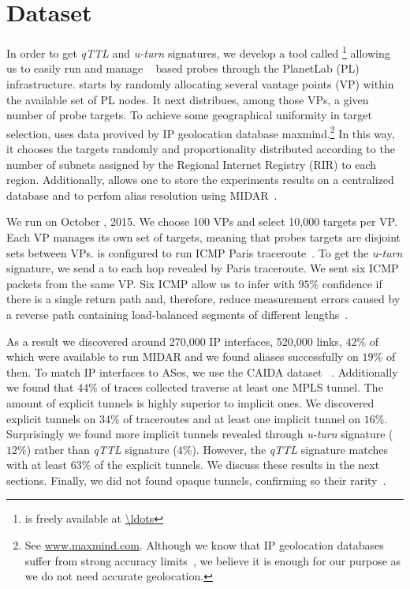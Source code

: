 \section{Dataset}\label{dataset}
In order to get \textit{qTTL} and \textit{u-turn} signatures, we develop a tool
called \magallanes\footnote{\magallanes is freely available at \url{\ldots}}
allowing us to easily run and manage \scamper~\cite{Luckie10} based probes
through the PlanetLab (PL) infrastructure.  \magallanes starts by randomly
allocating several vantage points (VP) within the available set of PL nodes.  It
next distribues, among those VPs, a given number of probe targets.
To achieve some geographical uniformity in target selection, \magallanes uses
data provived by IP geolocation database maxmind.\footnote{See
\url{www.maxmind.com}.  Although we know that IP geolocation databases suffer
from strong accuracy limits~\cite{geolocation}, we believe it is enough for our
purpose as we do not need accurate geolocation.}  In this way, it chooses the
targets randomly and proportionality distributed according to the number of
subnets assigned by the Regional Internet Registry (RIR) to each region.
Additionally, \magallanes allows one to store the experiments results on a
centralized database and to perfom alias resolution using MIDAR~\cite{Keys13}.

We run \magallanes on October , 2015.  We choose 100 VPs and select
10,000 targets per VP.  Each VP manages its own set of targets, meaning that
probes targets are disjoint sets between VPs.  \scamper is configured to run
ICMP Paris traceroute~\cite{BRICE06}.  To get the \textit{u-turn} signature,
we send a \ping to each hop revealed by Paris traceroute. We sent six
ICMP \echorequest packets from the same VP.  Six ICMP \echoreply allow us to
infer with $95\%$ confidence if there is a single return path and, 
therefore, reduce measurement errors caused by a reverse path containing
load-balanced segments of different lengths~\cite{BRICE07}. 

As a result we discovered around 270,000 IP interfaces,  520,000 links, $42\%$
of which were available to run MIDAR and we found aliases successfully on $19\%$
of then. To match IP interfaces to ASes, we use the CAIDA
dataset~\cite{caida_ref} .  Additionally we found that $44\%$ of traces collected
traverse at least one MPLS tunnel.  The amount of explicit tunnels is highly
superior to implicit ones. We discovered explicit tunnels on $34\%$ of
traceroutes and at least one implicit tunnel on $16\%$.
Surprisingly we found more implicit tunnels revealed through \textit{u-turn}
signature ($12\%$) rather than \textit{qTTL} signature ($4\%$). However, the
\textit{qTTL} signature matches with at least $63\%$ of the explicit tunnels. We
discuss these results in the next sections. Finally, we did not found opaque
tunnels, confirming so their rarity~\cite{VAN2013}.
